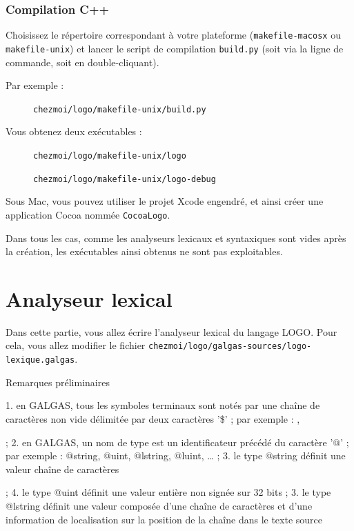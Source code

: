 \subsubsection{Compilation C++}
Choisissez le répertoire correspondant à votre plateforme (\texttt{makefile-macosx} ou \texttt{makefile-unix}) et lancer le script de compilation \texttt{build.py} (soit via la ligne de commande, soit en double-cliquant).

Par exemple :
\begin{description}
  \item[ ] \texttt{chezmoi/logo/makefile-unix/build.py}
\end{description}

Vous obtenez deux exécutables :
\begin{description}
  \item[ ] \texttt{chezmoi/logo/makefile-unix/logo}
  \item[ ] \texttt{chezmoi/logo/makefile-unix/logo-debug}
\end{description}

Sous Mac, vous pouvez utiliser le projet Xcode engendré, et ainsi créer une application Cocoa nommée \texttt{CocoaLogo}.

Dans tous les cas, comme les analyseurs lexicaux et syntaxiques sont vides après la création, les exécutables ainsi obtenus ne sont pas exploitables.


\section {Analyseur lexical}


Dans cette partie, vous allez écrire l’analyseur lexical du langage LOGO. Pour cela, vous allez modifier le fichier \texttt{chezmoi/logo/galgas-sources/logo-lexique.galgas}.

Remarques préliminaires

1.	en GALGAS, tous les symboles terminaux sont notés par une chaîne de caractères non vide délimitée par deux caractères '\$' ; par exemple : ,  

;
2.	en GALGAS, un nom de type est un identificateur précédé du caractère '@' ; par exemple : @string, @uint, @lstring, @luint, … ;
3.	le type @string définit une valeur chaîne de caractères 

;
4.	le type @uint définit une valeur entière non signée sur 32 bits ;
3.	le type @lstring définit une valeur composée d'une chaîne de caractères et d'une information de localisation sur la position de la chaîne dans le texte source 

